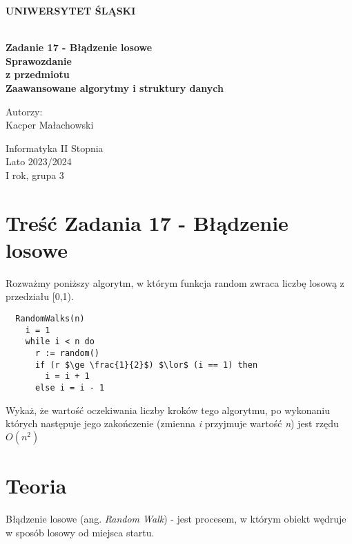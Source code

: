 \documentclass[12pt,oneside,a4paper]{book} %
\theoremstyle{break}
\begin{document}
\thispagestyle{empty}
\begin{center}
  \Large
  \bf{UNIWERSYTET ŚLĄSKI}\\
  \bf{}\\[25mm]
  \large

  \bf{Zadanie 17 - Błądzenie losowe}\\[35mm]

  Sprawozdanie\\
  z przedmiotu\\
  Zaawansowane algorytmy i struktury danych\\[25mm]
\end{center}
\begin{flushright}
  \large
  Autorzy:\\
  Kacper Małachowski\\
\end{flushright}
\vspace*{\fill}
\begin{center}
  Informatyka II Stopnia\\
  Lato 2023/2024\\
  I rok, grupa 3\\[25mm]
\end{center}

\chapter*{Treść Zadania 17 - Błądzenie losowe}

Rozważmy poniższy algorytm, w którym funkcja random zwraca liczbę losową z przedziału [0,1).
\begin{lstlisting}
  RandomWalks(n)
    i = 1
    while i < n do
      r := random()
      if (r $\ge \frac{1}{2}$) $\lor$ (i == 1) then
        i = i + 1
      else i = i - 1
\end{lstlisting}

Wykaż, że wartość oczekiwania liczby kroków tego algorytmu, po wykonaniu których następuje jego zakończenie (zmienna \textit{i} przyjmuje wartość \textit{n}) jest rzędu \textit{$O(n^2)$}

\chapter*{Teoria}

Błądzenie losowe (ang. \textit{Random Walk}) - jest procesem, w którym obiekt wędruje w sposób losowy od miejsca startu.
\end{document}
